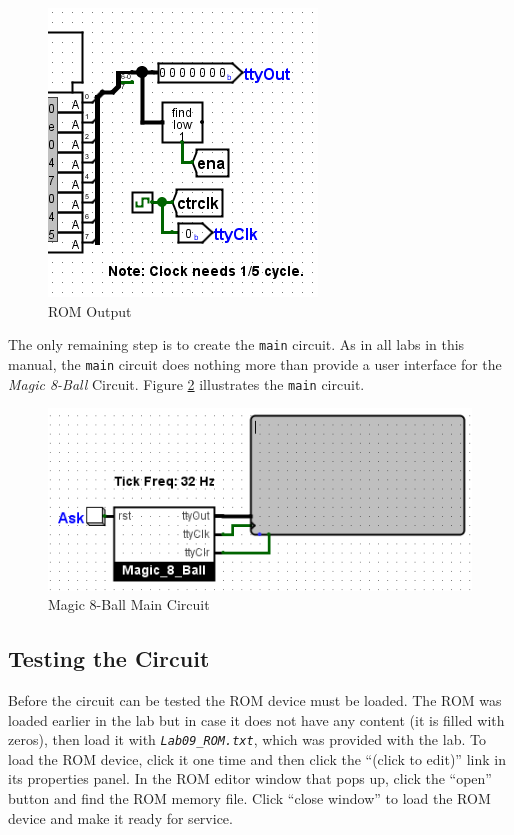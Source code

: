 \begin{figure}[H]
	\centering
	\includegraphics[width=\maxwidth{.95\linewidth}]{gfx/rom-09}
	\caption{ROM Output}
	\label{fig:rom-09}
\end{figure}

The only remaining step is to create the \lstinline[columns=fixed]|main| circuit. As in all labs in this manual, the \lstinline[columns=fixed]|main| circuit does nothing more than provide a user interface for the \textit{Magic 8-Ball} Circuit. Figure \ref{fig:rom-10} illustrates the \lstinline[columns=fixed]|main| circuit.

\begin{figure}[H]
	\centering
	\includegraphics[width=\maxwidth{.95\linewidth}]{gfx/rom-10}
	\caption{Magic 8-Ball Main Circuit}
	\label{fig:rom-10}
\end{figure}

\subsection{Testing the Circuit}

Before the circuit can be tested the ROM device must be loaded. The ROM was loaded earlier in the lab but in case it does not have any content (it is filled with zeros), then load it with \emph{\texttt{Lab09\_ROM.txt}}, which was provided with the lab. To load the ROM device, click it one time and then click the ``(click to edit)'' link in its properties panel. In the ROM editor window that pops up, click the ``open'' button and find the ROM memory file. Click ``close window'' to load the ROM device and make it ready for service.

